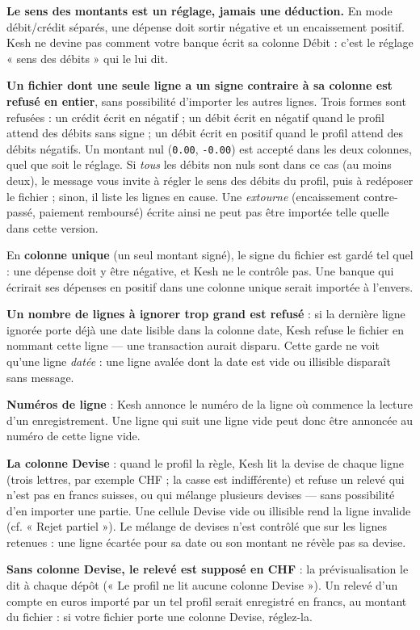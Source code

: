 \documentclass[a4paper,11pt,oneside]{article}
\begin{document}
\begin{keshwarning}
\textbf{Le sens des montants est un réglage, jamais une déduction.} En mode débit/crédit séparés, une dépense doit sortir négative et un encaissement positif. Kesh ne devine pas comment votre banque écrit sa colonne Débit : c'est le réglage « sens des débits » qui le lui dit.

\textbf{Un fichier dont une seule ligne a un signe contraire à sa colonne est refusé en entier}, sans possibilité d'importer les autres lignes. Trois formes sont refusées : un crédit écrit en négatif ; un débit écrit en négatif quand le profil attend des débits sans signe ; un débit écrit en positif quand le profil attend des débits négatifs. Un montant nul (\texttt{0.00}, \texttt{-0.00}) est accepté dans les deux colonnes, quel que soit le réglage. Si \emph{tous} les débits non nuls sont dans ce cas (au moins deux), le message vous invite à régler le sens des débits du profil, puis à redéposer le fichier ; sinon, il liste les lignes en cause. Une \emph{extourne} (encaissement contre-passé, paiement remboursé) écrite ainsi ne peut pas être importée telle quelle dans cette version.

En \textbf{colonne unique} (un seul montant signé), le signe du fichier est gardé tel quel : une dépense doit y être négative, et Kesh ne le contrôle pas. Une banque qui écrirait ses dépenses en positif dans une colonne unique serait importée à l'envers.
\end{keshwarning}

\begin{keshnote}
\textbf{Un nombre de lignes à ignorer trop grand est refusé} : si la dernière ligne ignorée porte déjà une date lisible dans la colonne date, Kesh refuse le fichier en nommant cette ligne — une transaction aurait disparu. Cette garde ne voit qu'une ligne \emph{datée} : une ligne avalée dont la date est vide ou illisible disparaît sans message.

\textbf{Numéros de ligne} : Kesh annonce le numéro de la ligne où commence la lecture d'un enregistrement. Une ligne qui suit une ligne vide peut donc être annoncée au numéro de cette ligne vide.

\textbf{La colonne Devise} : quand le profil la règle, Kesh lit la devise de chaque ligne (trois lettres, par exemple CHF ; la casse est indifférente) et refuse un relevé qui n'est pas en francs suisses, ou qui mélange plusieurs devises — sans possibilité d'en importer une partie. Une cellule Devise vide ou illisible rend la ligne invalide (cf. « Rejet partiel »). Le mélange de devises n'est contrôlé que sur les lignes retenues : une ligne écartée pour sa date ou son montant ne révèle pas sa devise.

\textbf{Sans colonne Devise, le relevé est supposé en CHF} : la prévisualisation le dit à chaque dépôt (« Le profil ne lit aucune colonne Devise »). Un relevé d'un compte en euros importé par un tel profil serait enregistré en francs, au montant du fichier : si votre fichier porte une colonne Devise, réglez-la.
\end{keshnote}
\end{document}
